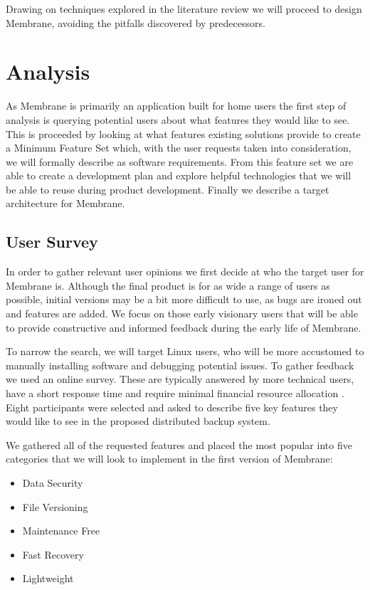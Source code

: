 \documentclass[11pt, a4paper, twocolumn, twoside]{report}
\begin{document}
Drawing on techniques explored in the literature review we will proceed to design Membrane, avoiding the pitfalls discovered by predecessors.

\chapter{Analysis}

As Membrane is primarily an application built for home users the first step of analysis is querying potential users about what features they would like to see. This is proceeded by looking at what features existing solutions provide to create a Minimum Feature Set which, with the user requests taken into consideration, we will formally describe as software requirements. From this feature set we are able to create a development plan and explore helpful technologies that we will be able to reuse during product development. Finally we describe a target architecture for Membrane.

\section{User Survey}

In order to gather relevant user opinions we first decide at who the target user for Membrane is. Although the final product is for as wide a range of users as possible, initial versions may be a bit more difficult to use, as bugs are ironed out and features are added. We focus on those early visionary users that will be able to provide constructive and informed feedback during the early life of Membrane. \label{txt:adv-users}

To narrow the search, we will target Linux users, who will be more accustomed to manually installing software and debugging potential issues. To gather feedback we used an online survey. These are typically answered by more technical users, have a short response time and require minimal financial resource allocation \citep{ilieva2002online}. Eight participants were selected and asked to describe five key features they would like to see in the proposed distributed backup system.

We gathered all of the requested features and placed the most popular into five categories that we will look to implement in the first version of Membrane:

\begin{itemize}
 \item Data Security
 \item File Versioning
 \item Maintenance Free
 \item Fast Recovery
 \item Lightweight
\end{itemize}
\end{document}

